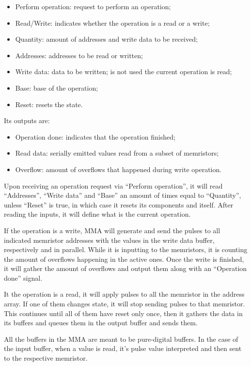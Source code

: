 \documentclass[ecp,tc,english]{iiufrgs}
\begin{document}
\begin{itemize}
    \item Perform operation: request to perform an operation;
    \item Read/Write: indicates whether the operation is a read or a write;
    \item Quantity: amount of addresses and write data to be received;
    \item Addresses: addresses to be read or written;
    \item Write data: data to be written; is not used the current operation is read;
    \item Base: base of the operation;
    \item Reset: resets the state.
\end{itemize}

Its outputs are:

\begin{itemize}
    \item Operation done: indicates that the operation finished;
    \item Read data: serially emitted values read from a subset of memristors;
    \item Overflow: amount of overflows that happened during write operation.
\end{itemize}

Upon receiving an operation request via “Perform operation”, it will read “Addresses”, “Write data” and “Base” an amount of times equal to “Quantity”, unless “Reset” is true, in which case it resets its components and itself. After reading the inputs, it will define what is the current operation.

If the operation is a write, MMA will generate and send the pulses to all indicated memristor addresses with the values in the write data buffer, respectively and in parallel. While it is inputting to the memristors, it is counting the amount of overflows happening in the active ones. Once the write is finished, it will gather the amount of overflows and output them along with an “Operation done” signal.

It the operation is a read, it will apply pulses to all the memristor in the address array. If one of them changes state, it will stop sending pulses to that memristor. This continues until all of them have reset only once, then it gathers the data in its buffers and queues them in the output buffer and sends them.

All the buffers in the MMA are meant to be pure-digital buffers. In the case of the input buffer, when a value is read, it's pulse value interpreted and then sent to the respective memristor.
\end{document}
